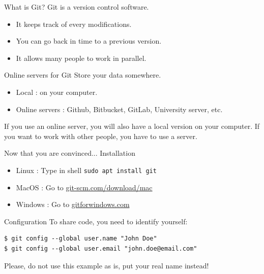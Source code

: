 \documentclass{beamer}
\begin{document}
	\begin{frame}{What is Git?}
		Git is a version control software. \newline
		
		\begin{itemize}
			\item It keeps track of every modifications.
			\item You can go back in time to a previous version.
			\item It allows many people to work in parallel.
		\end{itemize}	
	\end{frame}

	\begin{frame}{Online servers for Git}
		Store your data somewhere. \newline 
			\begin{itemize}
				\item Local : on your computer.
				\item Online servers : Github, Bitbucket, GitLab, University server, etc. \newline
			\end{itemize}
		If you use an online server, you will also have a local version on your computer. If you want to work with other people, you have to use a server. 
	\end{frame}

	\begin{frame}{Now that you are convinced... Installation}
		\begin{itemize}
			\item Linux : Type in shell \texttt{sudo apt install git}
			\item MacOS : Go to \url{git-scm.com/download/mac}
			\item Windows : Go to \url{gitforwindows.com}
		\end{itemize}
	\end{frame}

	\begin{frame}[fragile]{Configuration}
	To share code, you need to identify yourself:
	\begin{verbatim}
$ git config --global user.name "John Doe"
$ git config --global user.email "john.doe@email.com"
	\end{verbatim}
	Please, do not use this example as is, put your real name instead!
	\end{frame}
\end{document}
